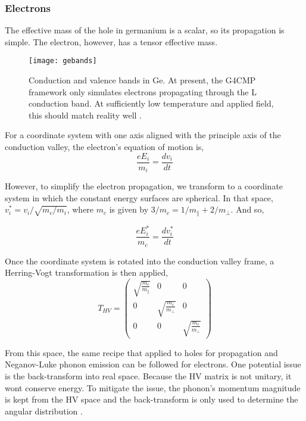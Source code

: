 \subsubsection{Electrons}
The effective mass of the hole in germanium is a scalar, so its
propagation is simple. The electron, however, has a tensor effective mass.
\begin{figure}[htpb]
    \centering
    \texttt{[image: gebands]}
    \caption{Conduction and valence bands in Ge. At present, the G4CMP
    framework only simulates electrons propagating through the L conduction
band. At sufficiently low temperature and applied field, this should match
reality well \cite{Leman}.}
    \label{fig:gebands}
\end{figure}

For a coordinate system with one axis aligned with the principle axis of the
conduction valley, the electron's equation of motion is,
\begin{equation}
    \frac{eE_i}{m_i} = \frac{dv_i}{dt}
    \label{el_eq_mtn}
\end{equation}

However, to simplify the electron propagation, we transform to a coordinate
system in which the constant energy surfaces are spherical. In that space,
$v_i^* = v_i/\sqrt{m_c/m_i}$, where $m_c$ is given by $3/m_c = 1/m_\parallel +
2/m_\perp$. And so,

\begin{equation}
    \frac{eE^*_i}{m_c} = \frac{dv_i^*}{dt}
    \label{el_eq_mtn1}
\end{equation}

Once the coordinate system is rotated into the conduction valley frame, a
Herring-Vogt transformation is then applied,
\begin{equation}
    T_{HV} = \left( \begin{array}{ccc}
                    \sqrt{\frac{m_c}{m_{\parallel}}} & 0 & 0 \\
                    0 & \sqrt{\frac{m_c}{m_{\perp}}} & 0 \\
                    0 & 0 & \sqrt{\frac{m_c}{m_{\perp}}}\end{array}\right)
    \label{HV}
\end{equation}

From this space, the same recipe that applied to holes for propagation and
Neganov-Luke phonon emission can be followed for electrons. One potential issue
is the back-transform into real space. Because the HV matrix is not unitary, it
wont conserve energy. To mitigate the issue, the phonon's momentum magnitude is
kept from the HV space and the back-transform is only used to determine the
angular distribution \cite{Leman}.



